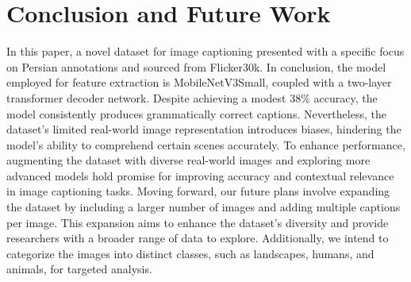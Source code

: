 \documentclass[runningheads]{llncs}
\begin{document}
\section{Conclusion and Future Work}
In this paper, a novel dataset for image captioning presented with a specific focus on Persian annotations and sourced from Flicker30k.
In conclusion, the model employed for feature extraction is MobileNetV3Small, coupled with a two-layer transformer decoder network. Despite achieving a modest 38\% accuracy, the model consistently produces grammatically correct captions. Nevertheless, the dataset's limited real-world image representation introduces biases, hindering the model's ability to comprehend certain scenes accurately. To enhance performance, augmenting the dataset with diverse real-world images and exploring more advanced models hold promise for improving accuracy and contextual relevance in image captioning tasks.
Moving forward, our future plans involve expanding the dataset by including a larger number of images and adding multiple captions per image. This expansion aims to enhance the dataset's diversity and provide researchers with a broader range of data to explore. Additionally, we intend to categorize the images into distinct classes, such as landscapes, humans, and animals, for targeted analysis.
\end{document}
